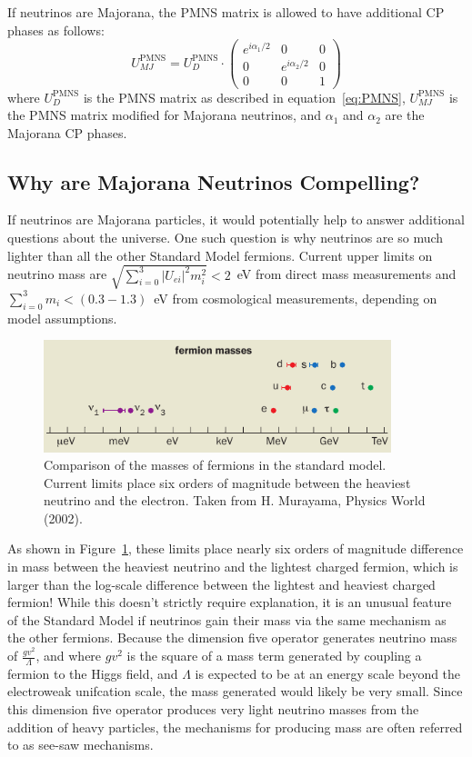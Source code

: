 \documentclass[/main.tex]{subfiles}
\begin{document}
If neutrinos are Majorana, the PMNS matrix is allowed to have additional CP phases as follows:
\begin{equation}
  U^{\mathrm{PMNS}}_{MJ}=U^{\mathrm{PMNS}}_D\cdot\begin{pmatrix}
    e^{i\alpha_1/2} & 0 & 0 \\
    0 & e^{i\alpha_2/2} & 0 \\
    0 & 0 & 1
  \end{pmatrix}
\end{equation}
where $U^{\mathrm{PMNS}}_D$ is the PMNS matrix as described in equation~\ref{eq:PMNS}, $U^{\mathrm{PMNS}}_{MJ}$ is the PMNS matrix modified for Majorana neutrinos, and $\alpha_1$ and $\alpha_2$ are the Majorana CP phases.

\subsection{Why are Majorana Neutrinos Compelling?} \label{sec:implications}
If neutrinos are Majorana particles, it would potentially help to answer additional questions about the universe.
One such question is why neutrinos are so much lighter than all the other Standard Model fermions.
Current upper limits on neutrino mass are $\sqrt{\sum_{i=0}^{3}|U_{ei}|^2m_i^2}<2$~eV from direct mass measurements and $\sum_{i=0}^3m_i<(0.3-1.3)$~eV from cosmological measurements, depending on model assumptions\cite{PDG2018}.
\begin{figure}[t]
  \centering
  \includegraphics[width=0.9\textwidth]{numasssmall}
  \caption[Mass of Standard Model Fermions]{\label{fig:SMfermionmasses}
    Comparison of the masses of fermions in the standard model. Current limits place six orders of magnitude between the heaviest neutrino and the electron. Taken from H. Murayama, Physics World (2002).
  }
\end{figure}
As shown in Figure~\ref{fig:SMfermionmasses}, these limits place nearly six orders of magnitude difference in mass between the heaviest neutrino and the lightest charged fermion, which is larger than the log-scale difference between the lightest and heaviest charged fermion!
While this doesn't strictly require explanation, it is an unusual feature of the Standard Model if neutrinos gain their mass via the same mechanism as the other fermions.
Because the dimension five operator generates neutrino mass of $\frac{gv^2}{\Lambda}$, and where $gv^2$ is the square of a mass term generated by coupling a fermion to the Higgs field, and $\Lambda$ is expected to be at an energy scale beyond the electroweak unifcation scale, the mass generated would likely be very small.
Since this dimension five operator produces very light neutrino masses from the addition of heavy particles, the mechanisms for producing mass are often referred to as see-saw mechanisms.
\end{document}
